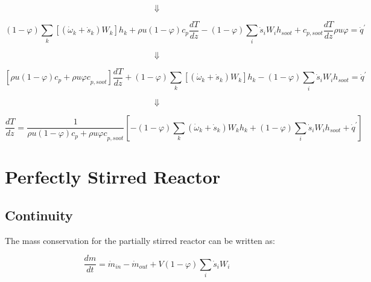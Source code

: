 \begin{equation*}
	\Downarrow
\end{equation*}

\begin{equation*}
	\left(1-\varphi\right)\sum_{k}{\left[({\dot{\omega}}_k+{\dot{s}}_k)W_k\right]h_k}
	+
	\rho u\left(1-\varphi\right)c_p\frac{dT}{dz}-(1-\varphi)\sum_{i}{{\dot{s}}_iW_i}h_{soot}+c_{p,soot}\frac{dT}{dz}\rho u\varphi={\dot{q}}^\prime
\end{equation*}

\begin{equation*}
	\Downarrow
\end{equation*}


\begin{equation*}
	\left[\rho u\left(1-\varphi\right){c}_p+{\rho u\varphi c}_{p,soot}\right]\frac{dT}{dz}+\left(1-\varphi\right)\sum_{k}{\left[({\dot{\omega}}_k+{\dot{s}}_k)W_k\right]h_k}-(1-\varphi)\sum_{i}{{\dot{s}}_iW_i}h_{soot}={\dot{q}}^\prime
\end{equation*}

\begin{equation*}
	\Downarrow
\end{equation*}


\begin{equation*}
	\frac{dT}{dz}=\frac{1}{\rho u\left(1-\varphi\right){c}_p+{\rho u\varphi c}_{p,soot}}\left[-\left(1-\varphi\right)\sum_{k}{\left({\dot{\omega}}_k+{\dot{s}}_k\right)W_kh_k}+\left(1-\varphi\right)\sum_{i}{{\dot{s}}_iW_i}h_{soot}+{\dot{q}}^\prime\right]
\end{equation*}
\section{Perfectly Stirred Reactor}
\label{sec:derivpsr}

\subsection{Continuity}
The mass conservation for the partially stirred reactor can be written as:

\begin{equation}
	\frac{dm}{dt}={\dot{m}}_{in}-{\dot{m}}_{out}+V\left(1-\varphi\right)\sum_{i}{{\dot{s}}_iW_i}
	\label{eqn:app_contpsr}
\end{equation}

